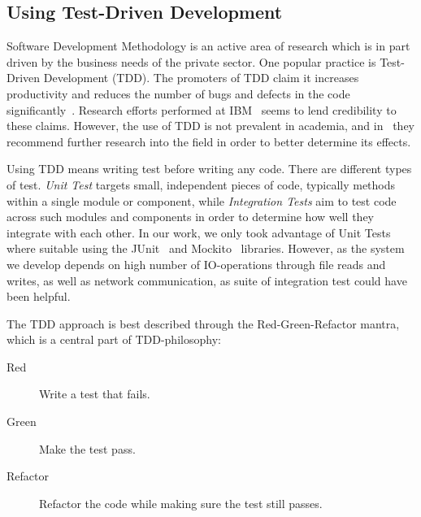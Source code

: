 \documentclass[UKenglish, a4paper]{ifimaster}
\begin{document}
        \subsection{Using Test-Driven Development}

        Software Development Methodology is an active area of research
        which is in part driven by the business needs of the private
        sector\cite{janzen2005test}. One popular practice is Test-Driven
        Development (TDD). The promoters of TDD claim it increases
        productivity and reduces the number of bugs and defects in the
        code significantly~\cite{beck2003test}. Research
        efforts performed at IBM~\cite{maximilien2003assessing} seems to
        lend credibility to these claims. However, the use of TDD is not
        prevalent in academia, and in~\cite{janzen2005test} they
        recommend further research into the field in order to better
        determine its effects.

        Using TDD means writing test before writing any code. There are
        different types of test. \emph{Unit Test} targets small,
        independent pieces of code, typically methods within a single
        module or component, while \emph{Integration Tests} aim to test
        code across such modules and components in order to determine
        how well they integrate with each other. In our work, we only
        took advantage of Unit Tests where suitable using the
        JUnit~\cite{junit} and Mockito~\cite{mockito} libraries.
        However, as the system we develop depends on  high number of
        IO-operations through file reads and writes, as well as network
        communication, as suite of integration test could have been
        helpful.

        The TDD approach is best described through the
        Red-Green-Refactor mantra, which is a central part of
        TDD-philosophy:

        \begin{description}
            \item[Red] Write a test that fails.
            \item[Green] Make the test pass.
            \item[Refactor] Refactor the code while making sure the test still passes.
        \end{description}
\end{document}
